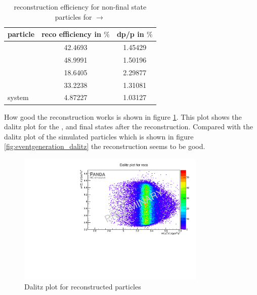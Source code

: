 		\begin{table}
		\centering
		\caption{reconstruction efficiency for non-final state particles for \pbarpSystem $\rightarrow$ \excitedanticascade \cascade}
		\label{tab:non-finalstate_efficiency_cc}
		
		\begin{tabular}{lcc}
		
			\hline
			particle & reco efficiency in $\%$ & dp/p in $\%$ \\\hline
			\hline
			\lam & 42.4693&   1.45429 \\
			\alam & 48.9991&   1.50196\\
			\cascade & 18.6405&   2.29877\\
			\excitedanticascade & 33.2238&   1.31081\\
			\excitedanticascade \cascade system & 4.87227&   1.03127\\\hline
			 	
		\end{tabular}
	\end{table}
	
	How good the reconstruction works is shown in figure \ref{fig:reco_dalitzplot}.
	This plot shows the dalitz plot for the \anticascade, \lam and \kminus final states after the reconstruction. 
	Compared with the dalitz plot of the simulated particles which is shown in figure \ref{fig:eventgeneration_dalitz} the reconstruction seems to be good.
	
	\begin{figure}
		\centering
		\includegraphics[width=0.8\textwidth]{./plots/pbarp/Dalitzplot_reco.pdf}
		\caption{Dalitz plot for reconstructed particles}
		\label{fig:reco_dalitzplot}
	
	\end{figure}
	